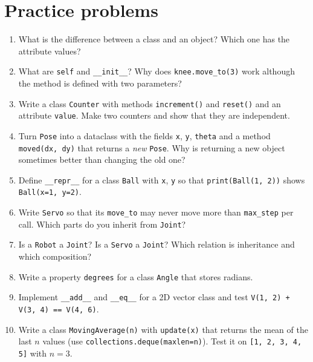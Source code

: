 \section*{Practice problems}
\begin{enumerate}[label=\textbf{\thechapter.\arabic*}]
  \item What is the difference between a class and an object? Which one has the attribute values?
  \item What are \texttt{self} and \texttt{\_\_init\_\_}? Why does \texttt{knee.move\_to(3)} work although the method is defined with two parameters?
  \item Write a class \texttt{Counter} with methods \texttt{increment()} and \texttt{reset()} and an attribute \texttt{value}. Make two counters and show that they are independent.
  \item Turn \texttt{Pose} into a dataclass with the fields \texttt{x}, \texttt{y}, \texttt{theta} and a method \texttt{moved(dx, dy)} that returns a \emph{new} \texttt{Pose}. Why is returning a new object sometimes better than changing the old one?
  \item Define \texttt{\_\_repr\_\_} for a class \texttt{Ball} with \texttt{x}, \texttt{y} so that \texttt{print(Ball(1, 2))} shows \texttt{Ball(x=1, y=2)}.
  \item Write \texttt{Servo} so that its \texttt{move\_to} may never move more than \texttt{max\_step} per call. Which parts do you inherit from \texttt{Joint}?
  \item Is a \texttt{Robot} a \texttt{Joint}? Is a \texttt{Servo} a \texttt{Joint}? Which relation is inheritance and which composition?
  \item Write a property \texttt{degrees} for a class \texttt{Angle} that stores radians.
  \item Implement \texttt{\_\_add\_\_} and \texttt{\_\_eq\_\_} for a 2D vector class and test \texttt{V(1, 2) + V(3, 4) == V(4, 6)}.
  \item[\textbf{\thechapter.10}$\star$] Write a class \texttt{MovingAverage(n)} with \texttt{update(x)} that returns the mean of the last $n$ values (use \texttt{collections.deque(maxlen=n)}). Test it on \texttt{[1, 2, 3, 4, 5]} with $n=3$.
\end{enumerate}
